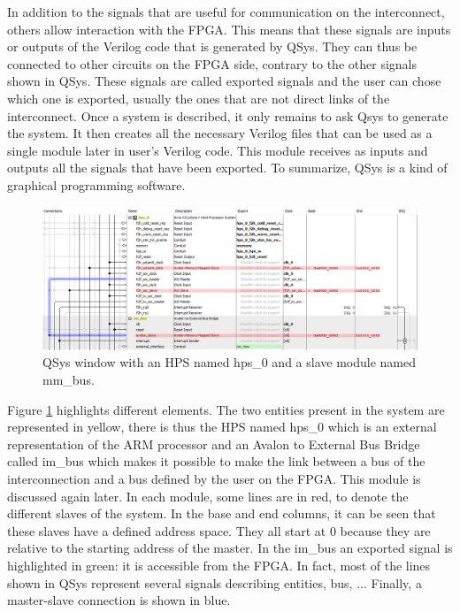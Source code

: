 In addition to the signals that are useful for communication on the interconnect, others allow interaction 
with the FPGA. This means that these signals are inputs or outputs of the Verilog code that is generated
by QSys. They can thus be connected to other circuits on the FPGA side, contrary to the other
signals shown in QSys. These signals are called exported signals and the user can chose which one
is exported, usually the ones that are not direct links of the interconnect. Once a system is 
described, it only
remains to ask Qsys to generate the system. It then creates all the necessary Verilog files that 
can be used as a single module later in user's Verilog code. This module receives as inputs and 
outputs all the signals that have been exported. To summarize, QSys is a kind of graphical 
programming software.

\begin{figure}[H]
    \centering
    \includegraphics[width=\linewidth]{Chapter2-FPGA_Flow/res/qsys.PNG}
    \caption{QSys window with an HPS named hps\_0 and a slave module named mm\_bus.}
    \label{fig:tools/qsys}
\end{figure}

Figure \ref{fig:tools/qsys} highlights different elements. The two entities present in the system are 
represented in yellow, there is thus the HPS named hps\_0 which is an external representation of the 
ARM processor and an Avalon to External Bus Bridge called im\_bus which makes it possible to make 
the link between a bus of the interconnection and a bus defined by the user on the FPGA. This module 
is discussed again later. In each module, some lines are in red, to denote the 
different slaves of the system. In the base and end columns, it can be seen that these slaves have 
a defined address space. They all start at 0 because they are relative to the starting address of 
the master. In the im\_bus an exported signal is highlighted in green: it is accessible 
from the FPGA. In fact, most of the lines shown in QSys represent several signals describing entities,
bus, ... Finally, a master-slave connection is shown in blue.

